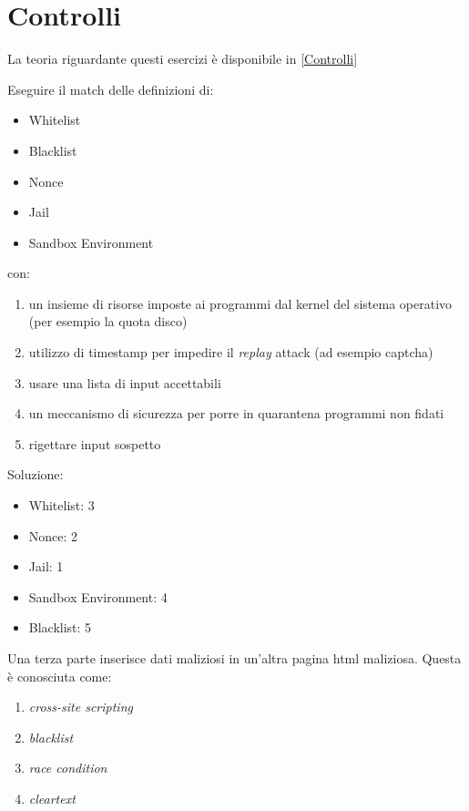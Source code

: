 \section{Controlli}
\label{es:Controlli}

La teoria riguardante questi esercizi è disponibile in \ref{Controlli}

\begin{Exercise} [
  title={Associa i termini},
  label={esControlli1}
  ]

  \Question Eseguire il match delle definizioni di:
\begin{itemize}
\item Whitelist
\item Blacklist
\item Nonce
\item Jail
\item Sandbox Environment
\end{itemize}
con:
\begin{enumerate}
 \item un insieme di risorse imposte ai programmi dal kernel del sistema 
operativo (per esempio la quota disco)
 \item utilizzo di timestamp per impedire il \textit{replay} attack (ad esempio 
captcha)
 \item usare una lista di input accettabili
 \item un meccanismo di sicurezza per porre in quarantena programmi non fidati
 \item rigettare input sospetto
\end{enumerate}

\end{Exercise}

\begin{Answer} [
  ref={esControlli1},
  number={1}
  ]

  \Question Soluzione:
\begin{itemize}
\item Whitelist: 3 
\item Nonce: 2
\item Jail: 1
\item Sandbox Environment: 4
\item Blacklist: 5

\end{itemize}

\end{Answer}



\begin{Exercise} [
  title={Quiz},
  label={esControlli2}
  ]

  \Question Una terza parte inserisce dati maliziosi in un'altra pagina html 
maliziosa. Questa è conosciuta come:
\begin{enumerate}
\item \textit{cross-site scripting}
\item \textit{blacklist}
\item \textit{race condition}
\item \textit{cleartext}
\end{enumerate}

\end{Exercise}

